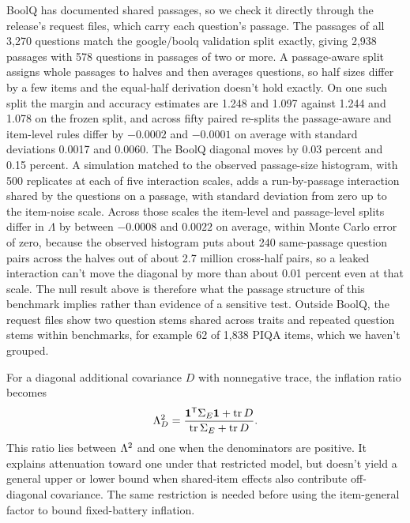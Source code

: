 BoolQ has documented shared passages, so we check it directly through the release's request files, which carry each question's passage. The passages of all 3,270 questions match the google/boolq validation split exactly, giving 2,938 passages with 578 questions in passages of two or more. A passage-aware split assigns whole passages to halves and then averages questions, so half sizes differ by a few items and the equal-half derivation doesn't hold exactly. On one such split the margin and accuracy estimates are 1.248 and 1.097 against 1.244 and 1.078 on the frozen split, and across fifty paired re-splits the passage-aware and item-level rules differ by $-0.0002$ and $-0.0001$ on average with standard deviations 0.0017 and 0.0060. The BoolQ diagonal moves by 0.03 percent and 0.15 percent. A simulation matched to the observed passage-size histogram, with 500 replicates at each of five interaction scales, adds a run-by-passage interaction shared by the questions on a passage, with standard deviation from zero up to the item-noise scale. Across those scales the item-level and passage-level splits differ in $\Lambda$ by between $-0.0008$ and $0.0022$ on average, within Monte Carlo error of zero, because the observed histogram puts about 240 same-passage question pairs across the halves out of about 2.7 million cross-half pairs, so a leaked interaction can't move the diagonal by more than about 0.01 percent even at that scale. The null result above is therefore what the passage structure of this benchmark implies rather than evidence of a sensitive test. Outside BoolQ, the request files show two question stems shared across traits and repeated question stems within benchmarks, for example 62 of 1,838 PIQA items, which we haven't grouped.

For a diagonal additional covariance $D$ with nonnegative trace, the inflation ratio becomes
\begin{equation}
\Lambda_D^2=\frac{\mathbf1^{\mathsf T}\Sigma_E\mathbf1+\operatorname{tr}D}
{\operatorname{tr}\Sigma_E+\operatorname{tr}D}. \end{equation}
This ratio lies between $\Lambda^2$ and one when the denominators are positive. It explains attenuation toward one under that restricted model, but doesn't yield a general upper or lower bound when shared-item effects also contribute off-diagonal covariance. The same restriction is needed before using the item-general factor to bound fixed-battery inflation.

